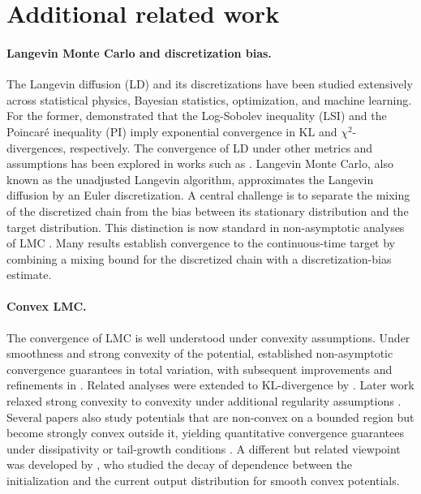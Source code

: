 \documentclass[10pt, journal]{IEEEtran}
\begin{document}
%





\appendices
\section{Additional related work}
\label{whole_literature}

\paragraph{Langevin Monte Carlo and discretization bias.}
The Langevin diffusion (LD) and its discretizations have been studied extensively across statistical physics, Bayesian statistics, optimization, and machine learning. For the former, \cite{bakry2014analysis} demonstrated that the Log-Sobolev inequality (LSI) and the Poincar\'e inequality (PI) imply exponential convergence in KL and $\chi^2$-divergences, respectively. The convergence of LD under other metrics and assumptions has been explored in works such as \cite{Hosseini2023Towards, chewi2022analysis, vempala2019advances}. Langevin Monte Carlo, also known as the unadjusted Langevin algorithm, approximates the Langevin diffusion by an Euler discretization. A central challenge is to separate the mixing of the discretized chain from the bias between its stationary distribution and the target distribution. This distinction is now standard in non-asymptotic analyses of LMC \cite{dalalyan2017theoretical,cheng2018convergence,vempala2019advances,durmus2019analysis,chewi2022analysis}. Many results establish convergence to the continuous-time target by combining a mixing bound for the discretized chain with a discretization-bias estimate.

\paragraph{Convex LMC.} The convergence of LMC is well understood under convexity assumptions. Under smoothness and strong convexity of the potential, \cite{dalalyan2017theoretical} established non-asymptotic convergence guarantees in total variation, with subsequent improvements and refinements in \cite{durmus2016high,dalalyan2019user}. Related analyses were extended to KL-divergence by \cite{cheng2018convergence}. Later work relaxed strong convexity to convexity under additional regularity assumptions \cite{durmus2019analysis,dalalyan2022bounding}. Several papers also study potentials that are non-convex on a bounded region but become strongly convex outside it, yielding quantitative convergence guarantees under dissipativity or tail-growth conditions \cite{cheng2018sharp,cheng2020stochastic,ma2019sampling,majka2020nonasymptotic,zheng2022constrained}. A different but related viewpoint was developed by \cite{liang2024independent}, who studied the decay of dependence between the initialization and the current output distribution for smooth convex potentials. 
\end{document}

